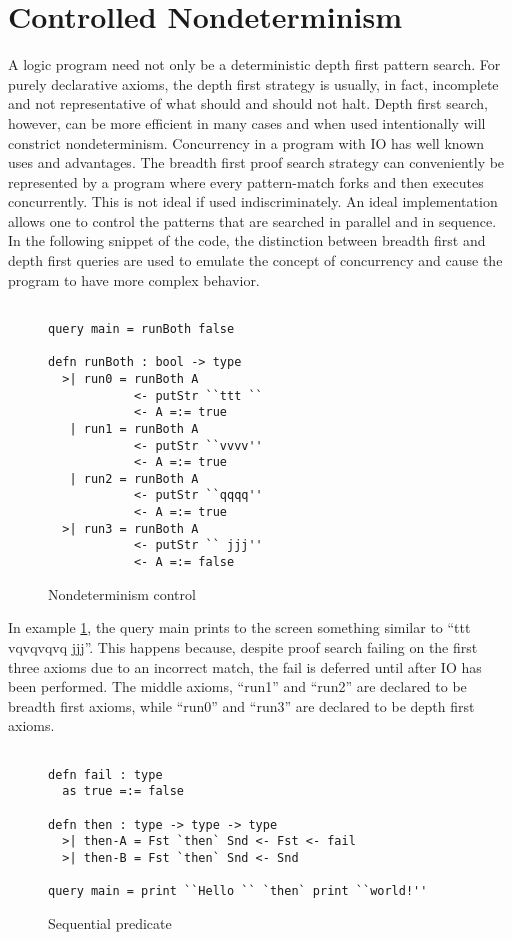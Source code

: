 \section{Controlled Nondeterminism}

A logic program need not only be a deterministic depth first pattern search. For purely declarative 
axioms, the depth first strategy is usually, in fact, incomplete 
and not representative of what should and should not halt.
Depth first search, however, can be more efficient in many cases and when used intentionally
will constrict nondeterminism. Concurrency in a program with IO has
well known uses and advantages. The breadth first proof search strategy can conveniently
be represented by a program where every pattern-match forks and then executes
concurrently. This is not ideal if used indiscriminately. An ideal implementation
allows one to control the patterns that are searched in parallel and in sequence. 
In the following snippet of the code, the distinction between
breadth first and depth first queries are used to emulate the concept of concurrency and
cause the program to have more complex behavior.

\begin{figure}[H]
\begin{lstlisting}

query main = runBoth false

defn runBoth : bool -> type
  >| run0 = runBoth A
            <- putStr ``ttt ``
            <- A =:= true
   | run1 = runBoth A 
            <- putStr ``vvvv''
            <- A =:= true
   | run2 = runBoth A
            <- putStr ``qqqq''
            <- A =:= true
  >| run3 = runBoth A
            <- putStr `` jjj''
            <- A =:= false

\end{lstlisting}
\caption{Nondeterminism control}
\label{nondet:ex1}
\end{figure}

In example \ref{nondet:ex1}, the query main prints to the screen something similar to “ttt
vqvqvqvq jjj”. This happens because, despite proof search failing on the first three axioms due
to an incorrect match, the fail is deferred until after IO has been performed. The middle
axioms, ``run1'' and ``run2'' are declared to be breadth first axioms, while ``run0'' and ``run3'' are
declared to be depth first axioms.


\begin{figure}[H]
\begin{lstlisting}

defn fail : type
  as true =:= false

defn then : type -> type -> type
  >| then-A = Fst `then` Snd <- Fst <- fail
  >| then-B = Fst `then` Snd <- Snd

query main = print ``Hello `` `then` print ``world!''

\end{lstlisting}
\caption{Sequential predicate}
\label{nondet:seq}
\end{figure}

